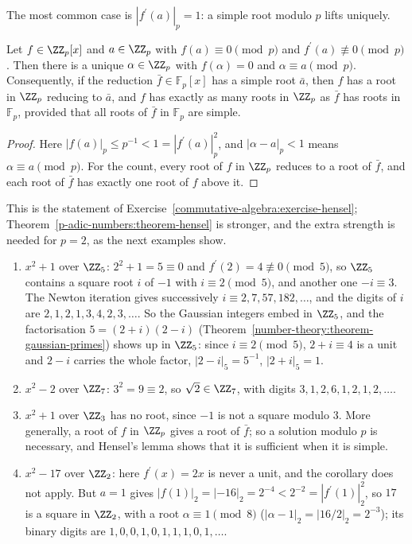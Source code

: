 The most common case is $|f^{\prime}(a)|_p = 1$: a simple root modulo $p$ lifts uniquely.

\begin{corollary}\label{p-adic-numbers:corollary-hensel-simple}
Let $f \in \ZZ_p[x]$ and $a \in \ZZ_p$ with $f(a) \equiv 0 \pmod p$ and $f^{\prime}(a) \not\equiv 0 \pmod p$. Then there is a unique $\alpha \in \ZZ_p$ with $f(\alpha) = 0$ and $\alpha \equiv a \pmod p$.
Consequently, if the reduction $\bar f \in \mathbb{F}_p[x]$ has a simple root $\bar a$, then $f$ has a root in $\ZZ_p$ reducing to $\bar a$, and $f$ has exactly as many roots in $\ZZ_p$ as $\bar f$ has
roots in $\mathbb{F}_p$, provided that all roots of $\bar f$ in $\mathbb{F}_p$ are simple.
\end{corollary}

\begin{proof}
Here $|f(a)|_p \leq p^{-1} < 1 = |f^{\prime}(a)|_p^2$, and $|\alpha - a|_p < 1$ means $\alpha \equiv a \pmod p$. For the count, every root of $f$ in $\ZZ_p$ reduces to a root of $\bar f$, and each root of
$\bar f$ has exactly one root of $f$ above it.
\end{proof}

This is the statement of Exercise~\ref{commutative-algebra:exercise-hensel}; Theorem~\ref{p-adic-numbers:theorem-hensel} is stronger, and the extra strength is needed for $p = 2$, as the next examples
show.

\begin{example}\label{p-adic-numbers:example-hensel}
\begin{enumerate}
\item $x^2 + 1$ over $\ZZ_5$: $2^2 + 1 = 5 \equiv 0$ and $f^{\prime}(2) = 4 \not\equiv 0 \pmod 5$, so $\ZZ_5$ contains a square root $i$ of $-1$ with $i \equiv 2 \pmod 5$, and another one $-i \equiv 3$. The Newton
iteration gives successively $i \equiv 2, 7, 57, 182, \ldots$, and the digits of $i$ are $2, 1, 2, 1, 3, 4, 2, 3, \ldots$. So the Gaussian integers embed in $\ZZ_5$, and the factorisation
$5 = (2 + i)(2 - i)$ (Theorem~\ref{number-theory:theorem-gaussian-primes}) shows up in $\ZZ_5$: since $i \equiv 2 \pmod 5$, $2 + i \equiv 4$ is a unit and $2 - i$ carries the whole factor,
$|2 - i|_5 = 5^{-1}$, $|2 + i|_5 = 1$.
\item $x^2 - 2$ over $\ZZ_7$: $3^2 = 9 \equiv 2$, so $\sqrt 2 \in \ZZ_7$, with digits $3, 1, 2, 6, 1, 2, 1, 2, \ldots$.
\item $x^2 + 1$ over $\ZZ_3$ has no root, since $-1$ is not a square modulo $3$. More generally, a root of $f$ in $\ZZ_p$ gives a root of $\bar f$; so a solution modulo $p$ is necessary, and Hensel's lemma
shows that it is sufficient when it is simple.
\item $x^2 - 17$ over $\ZZ_2$: here $f^{\prime}(x) = 2x$ is never a unit, and the corollary does not apply. But $a = 1$ gives $|f(1)|_2 = |{-16}|_2 = 2^{-4} < 2^{-2} = |f^{\prime}(1)|_2^2$, so $17$ is a square in
$\ZZ_2$, with a root $\alpha \equiv 1 \pmod 8$ ($|\alpha - 1|_2 = |16/2|_2 = 2^{-3}$); its binary digits are $1, 0, 0, 1, 0, 1, 1, 1, 0, 1, \ldots$.
\end{enumerate}
\end{example}

